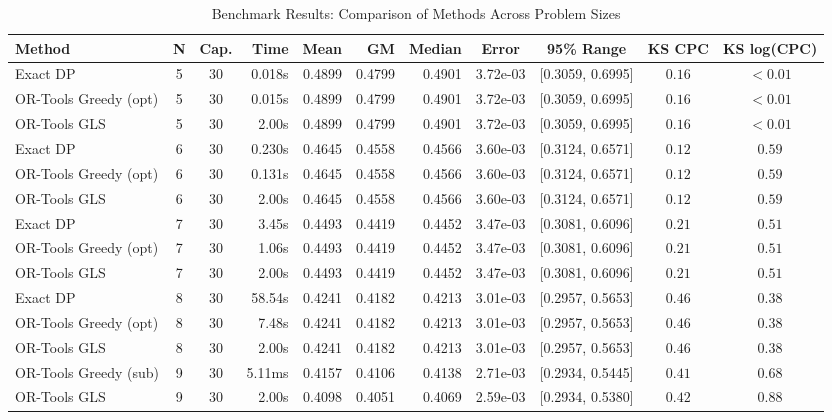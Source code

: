 \begin{table*}[htbp]
\centering
\caption{Benchmark Results: Comparison of Methods Across Problem Sizes}
\label{tab:benchmark-comparison}
\small
\begin{tabular}{@{}l c c r r r r c c c c@{}}
\toprule
\textbf{Method} & \textbf{N} & \textbf{Cap.} & \textbf{Time} & \textbf{Mean} & \textbf{GM} & \textbf{Median} & \textbf{Error} & \textbf{95\% Range} & \textbf{KS CPC} & \textbf{KS log(CPC)} \\
\midrule
Exact DP & 5 & 30 & 0.018s & 0.4899 & 0.4799 & 0.4901 & 3.72e-03 & [0.3059, 0.6995] & $0.16$ & $<0.01$ \\
OR-Tools Greedy (opt) & 5 & 30 & 0.015s & 0.4899 & 0.4799 & 0.4901 & 3.72e-03 & [0.3059, 0.6995] & $0.16$ & $<0.01$ \\
OR-Tools GLS & 5 & 30 & 2.00s & 0.4899 & 0.4799 & 0.4901 & 3.72e-03 & [0.3059, 0.6995] & $0.16$ & $<0.01$ \\
\midrule
Exact DP & 6 & 30 & 0.230s & 0.4645 & 0.4558 & 0.4566 & 3.60e-03 & [0.3124, 0.6571] & $0.12$ & $0.59$ \\
OR-Tools Greedy (opt) & 6 & 30 & 0.131s & 0.4645 & 0.4558 & 0.4566 & 3.60e-03 & [0.3124, 0.6571] & $0.12$ & $0.59$ \\
OR-Tools GLS & 6 & 30 & 2.00s & 0.4645 & 0.4558 & 0.4566 & 3.60e-03 & [0.3124, 0.6571] & $0.12$ & $0.59$ \\
\midrule
Exact DP & 7 & 30 & 3.45s & 0.4493 & 0.4419 & 0.4452 & 3.47e-03 & [0.3081, 0.6096] & $0.21$ & $0.51$ \\
OR-Tools Greedy (opt) & 7 & 30 & 1.06s & 0.4493 & 0.4419 & 0.4452 & 3.47e-03 & [0.3081, 0.6096] & $0.21$ & $0.51$ \\
OR-Tools GLS & 7 & 30 & 2.00s & 0.4493 & 0.4419 & 0.4452 & 3.47e-03 & [0.3081, 0.6096] & $0.21$ & $0.51$ \\
\midrule
Exact DP & 8 & 30 & 58.54s & 0.4241 & 0.4182 & 0.4213 & 3.01e-03 & [0.2957, 0.5653] & $0.46$ & $0.38$ \\
OR-Tools Greedy (opt) & 8 & 30 & 7.48s & 0.4241 & 0.4182 & 0.4213 & 3.01e-03 & [0.2957, 0.5653] & $0.46$ & $0.38$ \\
OR-Tools GLS & 8 & 30 & 2.00s & 0.4241 & 0.4182 & 0.4213 & 3.01e-03 & [0.2957, 0.5653] & $0.46$ & $0.38$ \\
\midrule
OR-Tools Greedy (sub) & 9 & 30 & 5.11ms & 0.4157 & 0.4106 & 0.4138 & 2.71e-03 & [0.2934, 0.5445] & $0.41$ & $0.68$ \\
OR-Tools GLS & 9 & 30 & 2.00s & 0.4098 & 0.4051 & 0.4069 & 2.59e-03 & [0.2934, 0.5380] & $0.42$ & $0.88$ \\

\end{tabular}
\end{table*}
